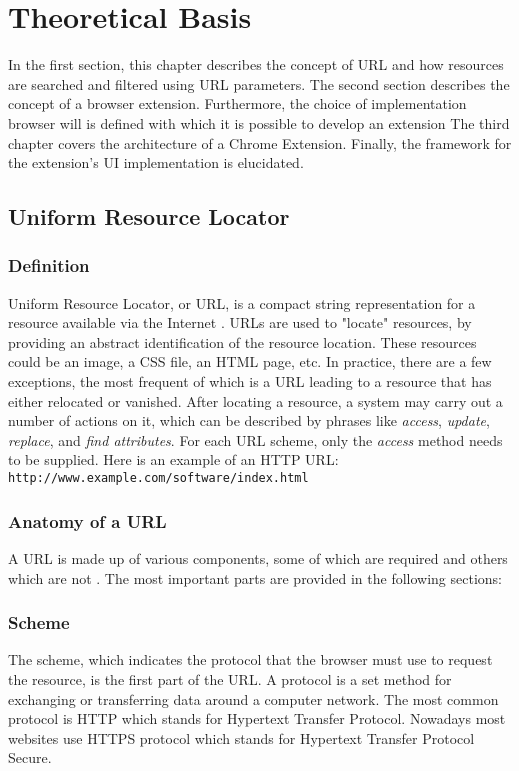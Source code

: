 \newpage
\chapter{Theoretical Basis}
In the first section, this chapter describes the concept of URL and how resources are searched and filtered using URL parameters. The second section describes the concept of a browser extension. Furthermore, the choice of implementation browser will is defined with which it is possible to develop an extension The third chapter covers the architecture of a Chrome Extension. Finally, the framework for the extension's UI implementation is elucidated.


\section{Uniform Resource Locator}

\subsection{Definition}
Uniform Resource Locator, or URL, is a compact string representation for a resource available via the Internet \autocite{berners1994uniform}. URLs are used to "locate" resources, by providing an abstract identification of the resource location. These resources could be an image, a CSS file, an HTML page, etc. In practice, there are a few exceptions, the most frequent of which is a URL leading to a resource that has either relocated or vanished. After locating a resource, a system may carry out a number of actions on it, which can be described by phrases like \textit{access}, \textit{update}, \textit{replace}, and \textit{find attributes}. For each URL scheme, only the \textit{access} method needs to be supplied. Here is an example of an HTTP URL: \texttt{http://www.example.com/software/index.html}

\subsection{Anatomy of a URL}
A URL is made up of various components, some of which are required and others which are not \autocite{mozilla2022url}. The most important parts are provided in the following sections:

\subsection*{Scheme}
The scheme, which indicates the protocol that the browser must use to request the resource, is the first part of the URL. A protocol is a set method for exchanging or transferring data around a computer network. The most common protocol is HTTP which stands for Hypertext Transfer Protocol. Nowadays most websites use HTTPS protocol which stands for Hypertext Transfer Protocol Secure.

